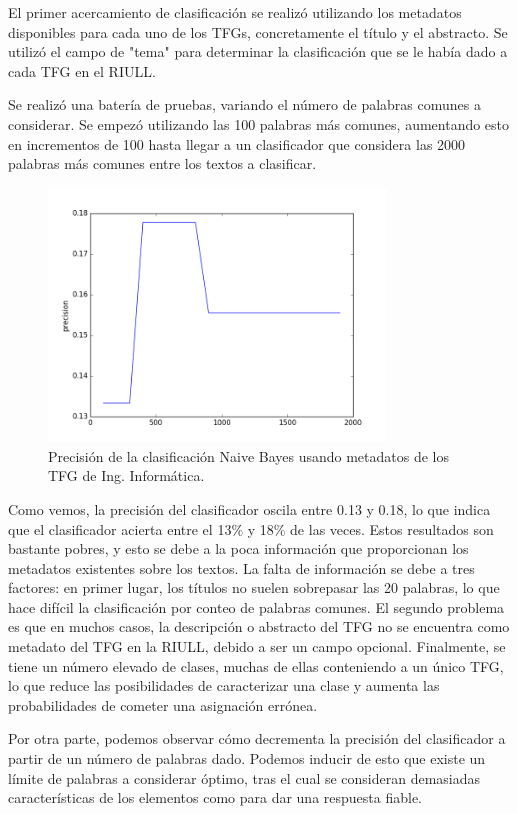 \lhead{\emph{\ChapterThree{}}}
\label{classification-conclusions}
El primer acercamiento de clasificación se realizó utilizando los metadatos disponibles para cada uno de los TFGs, concretamente el título y el abstracto. Se utilizó el campo de "tema" para determinar la clasificación que se le había dado a cada TFG en el RIULL.
%

Se realizó una batería de pruebas, variando el número de palabras comunes a considerar. Se empezó utilizando las 100 palabras más comunes, aumentando esto en incrementos de 100 hasta llegar a un clasificador que considera las 2000 palabras más comunes entre los textos a clasificar.

\begin{center}
\begin{figure}[!ht]
  \label{fig:metadata_view}
  \centering
    \includegraphics[width=0.8\textwidth]{Images/figure_1}
  \caption{Precisión de la clasificación Naive Bayes usando metadatos de los TFG de Ing. Informática.}
\end{figure}
\end{center}

Como vemos, la precisión del clasificador oscila entre 0.13 y 0.18, lo que indica que el clasificador acierta entre el 13\% y 18\% de las veces. Estos resultados son bastante pobres, y esto se debe a la poca información que proporcionan los metadatos existentes sobre los textos.
%
La falta de información se debe a tres factores: en primer lugar, los títulos no suelen sobrepasar las 20 palabras, lo que hace difícil la clasificación por conteo de palabras comunes. 
%
El segundo problema es que en muchos casos, la descripción o abstracto del TFG no se encuentra como metadato del TFG en la RIULL, debido a ser un campo opcional.
%
Finalmente, se tiene un número elevado de clases, muchas de ellas conteniendo a un único TFG, lo que reduce las posibilidades de caracterizar una clase y aumenta las probabilidades de cometer una asignación errónea.

Por otra parte, podemos observar cómo decrementa la precisión del clasificador a partir de un número de palabras dado. Podemos inducir de esto que existe un límite de palabras a considerar óptimo, tras el cual se consideran demasiadas características de los elementos como para dar una respuesta fiable.